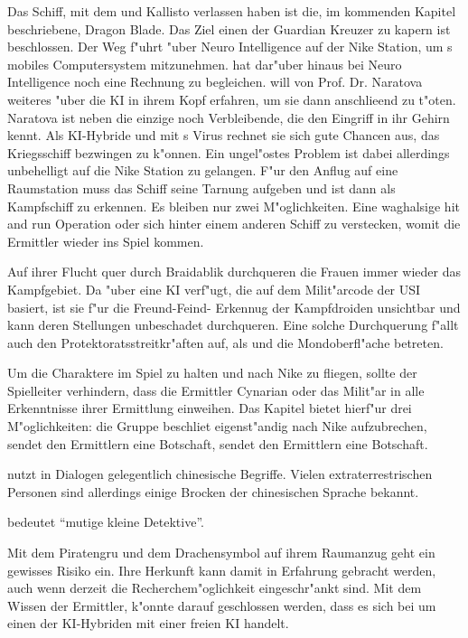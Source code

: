 \begin{remarks}
	Das Schiff, mit dem \xl{} und \ml{} Kallisto verlassen haben ist die, im kommenden Kapitel beschriebene, Dragon Blade. Das Ziel einen der Guardian Kreuzer zu kapern ist beschlossen. Der Weg f"uhrt "uber Neuro Intelligence auf der Nike Station, um \ml{}s mobiles Computersystem mitzunehmen. \xl{} hat dar"uber hinaus bei Neuro Intelligence noch eine Rechnung zu begleichen. \xl{} will von Prof. Dr. Naratova weiteres "uber die KI in ihrem Kopf erfahren, um sie dann anschlie\3end zu t"oten. Naratova ist neben \ml{} die einzige noch Verbleibende, die den Eingriff in ihr Gehirn kennt. Als KI-Hybride und mit \ml{}s Virus rechnet sie sich gute Chancen aus, das Kriegsschiff bezwingen zu k"onnen. Ein ungel"ostes Problem ist dabei allerdings unbehelligt auf die Nike Station zu gelangen. F"ur den Anflug auf eine Raumstation muss das Schiff seine Tarnung aufgeben und ist dann als Kampfschiff zu erkennen. Es bleiben nur zwei M"oglichkeiten. Eine waghalsige hit and run Operation oder sich hinter einem anderen Schiff zu verstecken, womit die Ermittler wieder ins Spiel kommen.

	Auf ihrer Flucht quer durch Braidablik durchqueren die Frauen immer wieder das Kampfgebiet. Da \xl{} "uber eine KI verf"ugt, die auf dem Milit"arcode der USI basiert, ist sie f"ur die Freund-Feind- Erkennug der Kampfdroiden unsichtbar und kann deren Stellungen unbeschadet durchqueren. Eine solche Durchquerung f"allt auch den Protektoratsstreitkr"aften auf, als \xl{} und \ml{} die Mondoberfl"ache betreten. 

	Um die Charaktere im Spiel zu halten und nach Nike zu fliegen, sollte der Spielleiter verhindern, dass die Ermittler Cynarian oder das Milit"ar in alle Erkenntnisse ihrer Ermittlung einweihen. Das Kapitel bietet hierf"ur drei M"oglichkeiten: die Gruppe beschlie\3t eigenst"andig nach Nike aufzubrechen, \xl{} sendet den Ermittlern eine Botschaft, \ml{} sendet den Ermittlern eine Botschaft.

	\xl{} nutzt in Dialogen gelegentlich chinesische Begriffe. Vielen extraterrestrischen Personen sind allerdings einige Brocken der chinesischen Sprache bekannt. 
	
	 bedeutet "`mutige kleine Detektive"'.

	Mit dem Piratengru\3 und dem Drachensymbol auf ihrem Raumanzug geht \xl{} ein gewisses Risiko ein. Ihre Herkunft kann damit in Erfahrung gebracht werden, auch wenn derzeit die Recherchem"oglichkeit eingeschr"ankt sind. Mit dem Wissen der Ermittler, k"onnte darauf geschlossen werden, dass es sich bei \xl{} um einen der KI-Hybriden mit einer freien KI handelt.
\end{remarks}
\vfill